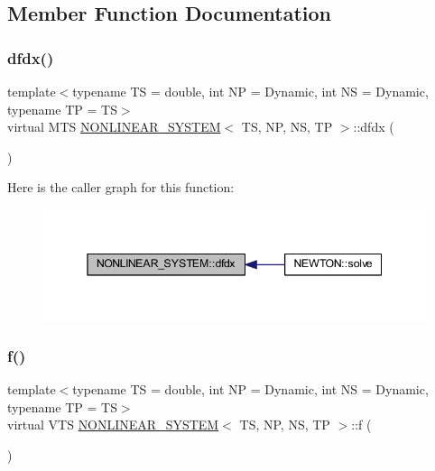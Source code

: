 \subsection{Member Function Documentation}
\mbox{\label{class_n_o_n_l_i_n_e_a_r___s_y_s_t_e_m_a531f56bcbc77f2219164af40aa16fad2}} 
\subsubsection{\texorpdfstring{dfdx()}{dfdx()}}
{\footnotesize\ttfamily template$<$typename TS = double, int NP = Dynamic, int NS = Dynamic, typename TP = TS$>$ \\
virtual M\+TS \mbox{\hyperlink{class_n_o_n_l_i_n_e_a_r___s_y_s_t_e_m}{N\+O\+N\+L\+I\+N\+E\+A\+R\+\_\+\+S\+Y\+S\+T\+EM}}$<$ TS, NP, NS, TP $>$\+::dfdx (\begin{DoxyParamCaption}{ }\end{DoxyParamCaption})\hspace{0.3cm}{\ttfamily [pure virtual]}}

Here is the caller graph for this function\+:
\nopagebreak
\begin{figure}[H]
\begin{center}
\leavevmode
\includegraphics[width=345pt]{class_n_o_n_l_i_n_e_a_r___s_y_s_t_e_m_a531f56bcbc77f2219164af40aa16fad2_icgraph}
\end{center}
\end{figure}
\mbox{\label{class_n_o_n_l_i_n_e_a_r___s_y_s_t_e_m_a65827d7df297f26cd3f14f472a212077}} 
\subsubsection{\texorpdfstring{f()}{f()}}
{\footnotesize\ttfamily template$<$typename TS = double, int NP = Dynamic, int NS = Dynamic, typename TP = TS$>$ \\
virtual V\+TS \mbox{\hyperlink{class_n_o_n_l_i_n_e_a_r___s_y_s_t_e_m}{N\+O\+N\+L\+I\+N\+E\+A\+R\+\_\+\+S\+Y\+S\+T\+EM}}$<$ TS, NP, NS, TP $>$\+::f (\begin{DoxyParamCaption}{ }\end{DoxyParamCaption})\hspace{0.3cm}{\ttfamily [pure virtual]}}


